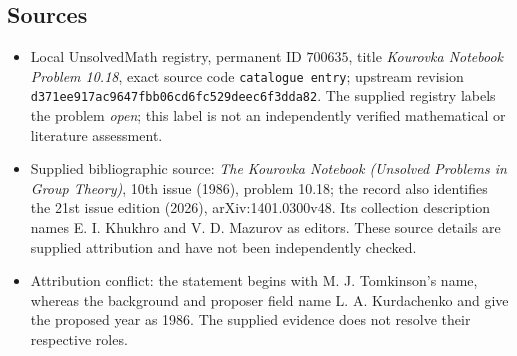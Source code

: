 \documentclass[11pt]{article}
\begin{document}
\subsection{Sources}
\begin{itemize}
\item Local UnsolvedMath registry, permanent ID \(700635\), title \emph{Kourovka Notebook Problem 10.18}, exact source code \texttt{catalogue entry}; upstream revision \texttt{d371ee917ac9647fbb06cd6fc529deec6f3dda82}. The supplied registry labels the problem \emph{open}; this label is not an independently verified mathematical or literature assessment.
\item Supplied bibliographic source: \emph{The Kourovka Notebook (Unsolved Problems in Group Theory)}, 10th issue (1986), problem 10.18; the record also identifies the 21st issue edition (2026), arXiv:1401.0300v48. Its collection description names E. I. Khukhro and V. D. Mazurov as editors. These source details are supplied attribution and have not been independently checked.
\item Attribution conflict: the statement begins with M. J. Tomkinson's name, whereas the background and proposer field name L. A. Kurdachenko and give the proposed year as 1986. The supplied evidence does not resolve their respective roles.
\end{itemize}
\end{document}
